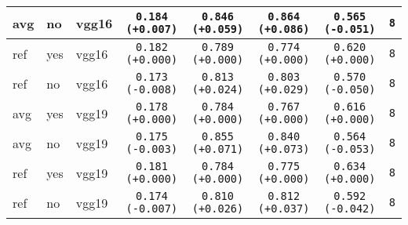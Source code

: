 \begin{tabular}{|l|l|l|c|c|c|c|c|}
avg & no & vgg16 & \texttt{0.184 {\color{green}(+0.007)}} & \texttt{0.846 {\color{red}(+0.059)}} & \texttt{0.864 {\color{red}(+0.086)}} & \texttt{0.565 {\color{red}(-0.051)}} & \texttt{8} \\
\hline
\rowcolor{verylightgray}ref & yes & vgg16 & \texttt{0.182 {\color{black}(+0.000)}} & \texttt{0.789 {\color{black}(+0.000)}} & \texttt{0.774 {\color{black}(+0.000)}} & \texttt{0.620 {\color{black}(+0.000)}} & \texttt{8} \\
ref & no & vgg16 & \texttt{0.173 {\color{red}(-0.008)}} & \texttt{0.813 {\color{red}(+0.024)}} & \texttt{0.803 {\color{red}(+0.029)}} & \texttt{0.570 {\color{red}(-0.050)}} & \texttt{8} \\
\hline
\rowcolor{verylightgray}avg & yes & vgg19 & \texttt{0.178 {\color{black}(+0.000)}} & \texttt{0.784 {\color{black}(+0.000)}} & \texttt{0.767 {\color{black}(+0.000)}} & \texttt{0.616 {\color{black}(+0.000)}} & \texttt{8} \\
avg & no & vgg19 & \texttt{0.175 {\color{red}(-0.003)}} & \texttt{0.855 {\color{red}(+0.071)}} & \texttt{0.840 {\color{red}(+0.073)}} & \texttt{0.564 {\color{red}(-0.053)}} & \texttt{8} \\
\hline
\rowcolor{verylightgray}ref & yes & vgg19 & \texttt{0.181 {\color{black}(+0.000)}} & \texttt{0.784 {\color{black}(+0.000)}} & \texttt{0.775 {\color{black}(+0.000)}} & \texttt{0.634 {\color{black}(+0.000)}} & \texttt{8} \\
ref & no & vgg19 & \texttt{0.174 {\color{red}(-0.007)}} & \texttt{0.810 {\color{red}(+0.026)}} & \texttt{0.812 {\color{red}(+0.037)}} & \texttt{0.592 {\color{red}(-0.042)}} & \texttt{8} \\
\hline
\end{tabular}
